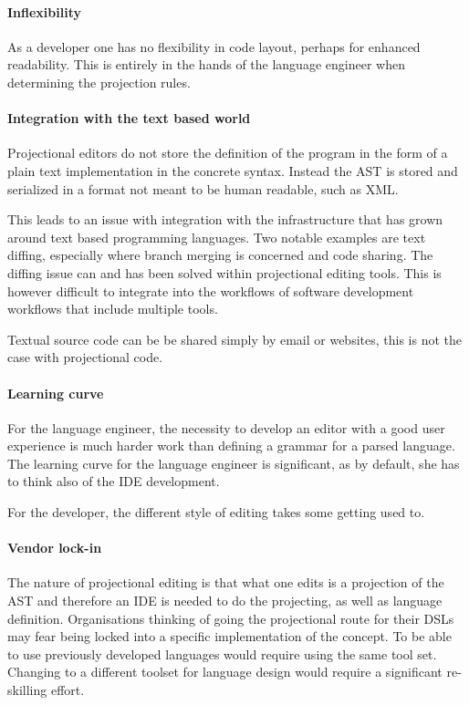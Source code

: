 \paragraph{Inflexibility}
As a developer one has no flexibility in code layout, perhaps for enhanced readability.
This is entirely in the hands of the language engineer when determining the projection rules.

\paragraph{Integration with the text based world}
Projectional editors do not store the definition of the program in the form of a plain text implementation in the concrete syntax.
Instead the AST is stored and serialized in a format not meant to be human readable, such as XML.

This leads to an issue with integration with the infrastructure that has grown around text based programming languages.
Two notable examples are text diffing, especially where branch merging is concerned and code sharing.
The diffing issue can and has been solved within projectional editing tools.
This is however difficult to integrate into the workflows of software development workflows that include multiple tools.

Textual source code can be be shared simply by email or websites, this is not the case with projectional code.

\paragraph{Learning curve}
For the language engineer, the necessity to develop an editor with a good user experience is much harder work than defining a grammar for a parsed language.
The learning curve for the language engineer is significant, as by default, she has to think also of the IDE development.

For the developer, the different style of editing takes some getting used to.

\paragraph{Vendor lock-in}
The nature of projectional editing is that what one edits is a projection of the AST and therefore an IDE is needed to do the projecting, as well as language definition.
Organisations thinking of going the projectional route for their DSLs may fear being locked into a specific implementation of the concept.
To be able to use previously developed languages would require using the same tool set.
Changing to a different toolset for language design would require a significant re-skilling effort.
